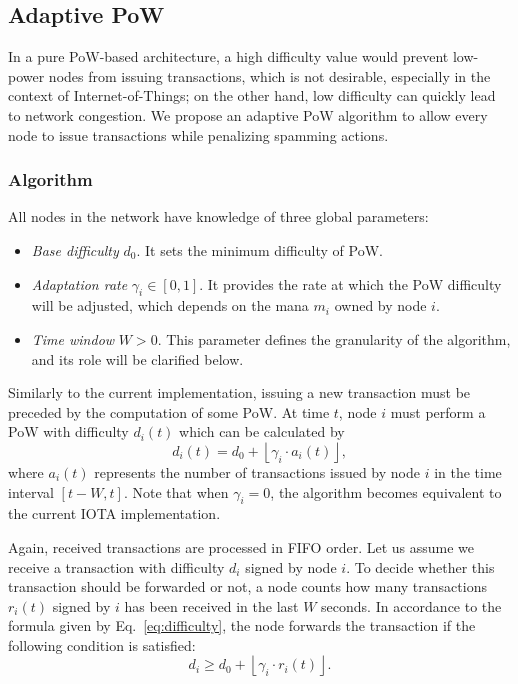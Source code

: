 \documentclass[../main.tex]{subfiles}
\begin{document}
\subsection{Adaptive PoW}\label{sec:adaptive_pow}

In a pure PoW-based architecture, a high difficulty value would prevent low-power nodes from issuing transactions, which is not desirable, especially in the context of Internet-of-Things; on the other hand, low difficulty can quickly lead to network congestion. We propose an adaptive PoW algorithm to allow every node to issue transactions while penalizing spamming actions.

\subsubsection{Algorithm}

All nodes in the network have knowledge of three global parameters:

\begin{itemize}
    \item \textit{Base difficulty} $d_0$. It sets the minimum difficulty of PoW.
    \item \textit{Adaptation rate} $\gamma_i\in [0, 1]$. It provides the rate at which the PoW difficulty will be adjusted, which depends on the mana $m_i$ owned by node $i$.
    \item \textit{Time window} $W>0$. This parameter defines the granularity of the algorithm, and its role will be clarified below.
\end{itemize}

Similarly to the current implementation, issuing a new transaction must be preceded by the computation of some PoW. At time $t$, node $i$ must perform a PoW with difficulty $d_i(t)$ which can be calculated by
\begin{equation}\label{eq:difficulty}
    d_i(t) = d_0 + \left \lfloor{\gamma_i\cdot a_i(t)}\right \rfloor,
\end{equation}
where $a_i(t)$ represents the number of transactions issued by node $i$ in the time interval $[t-W, t]$. Note that when $\gamma_i=0$, the algorithm becomes equivalent to the current IOTA implementation.

Again, received transactions are processed in FIFO order. Let us assume we receive a transaction with difficulty $d_i$ signed by node $i$. To decide whether this transaction should be forwarded or not, a node counts how many transactions $r_i(t)$ signed by $i$ has been received in the last $W$ seconds. In accordance to the formula given by Eq.~\eqref{eq:difficulty}, the node forwards the transaction if the following condition is satisfied:
\begin{equation*}
    d_i\geq d_0 + \left\lfloor{\gamma_i\cdot r_i(t)}\right\rfloor.
\end{equation*}
\end{document}
